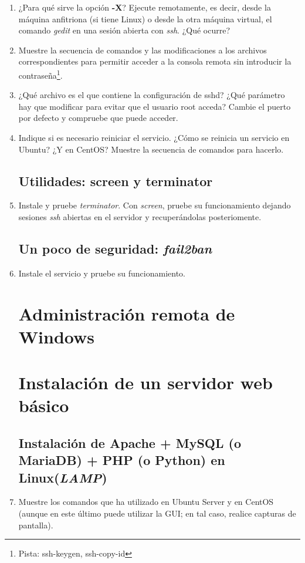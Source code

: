 \documentclass[paper=a4, fontsize=11pt]{scrartcl} %
\numberwithin{equation}{section} %
\numberwithin{figure}{section} %
\numberwithin{table}{section} %
\begin{document}
\begin{enumerate}
	\item ¿Para qué sirve la opción \textbf{-X}? Ejecute remotamente, es decir, desde la máquina
	anfitriona (si tiene Linux) o desde la otra máquina virtual, el comando \textit{gedit} en una sesión
	abierta con \textit{ssh}. ¿Qué ocurre?
	
	\item Muestre la secuencia de comandos y las modificaciones a los archivos correspondientes para
	permitir acceder a la consola remota sin introducir la contraseña\footnote{Pista: ssh-keygen, ssh-copy-id}.

	\item ¿Qué archivo es el que contiene la configuración de sshd? ¿Qué parámetro hay que modificar
	para evitar que el usuario root acceda? Cambie el puerto por defecto y compruebe que puede acceder.

	\item Indique si es necesario reiniciar el servicio. ¿Cómo se reinicia un servicio en Ubuntu?
	¿Y en CentOS? Muestre la secuencia de comandos para hacerlo.
	
	\subsection{Utilidades: screen y terminator}
	\item Instale y pruebe \textit{terminator}. Con \textit{screen}, pruebe su funcionamiento dejando
	sesiones \textit{ssh} abiertas en el servidor y recuperándolas posteriomente.
	
	\subsection{Un poco de seguridad: \textit{fail2ban}}
	\item Instale el servicio y pruebe su funcionamiento.
	
	\section{Administración remota de Windows}
	\section{Instalación de un servidor web básico}
	\subsection{Instalación de Apache + MySQL (o MariaDB) + PHP (o Python) en Linux(\textit{LAMP})}
	\item Muestre los comandos que ha utilizado en Ubuntu Server y en CentOS (aunque en este último puede
	utilizar la GUI; en tal caso, realice capturas de pantalla).
	

\end{enumerate}
\end{document}
